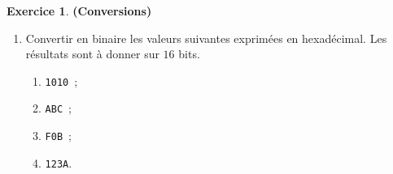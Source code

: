 \documentclass[12pt]{article}
\theoremstyle{definition}
\newtheorem{Exercice}{Exercice}
\begin{document}
\begin{Exercice} {\bf (Conversions)}
\begin{enumerate}
    \item Convertir en binaire les valeurs suivantes exprimées en 
    hexadécimal. Les résultats sont à donner sur $16$ bits.
    \begin{multicols}{2}
    \begin{enumerate}
        \item {\tt 1010}~;
        \item {\tt ABC}~;
        \item {\tt F0B}~;
        \item {\tt 123A}.
    \end{enumerate}
    \end{multicols}
\end{enumerate}
\end{Exercice}
\bigskip

\end{document}
